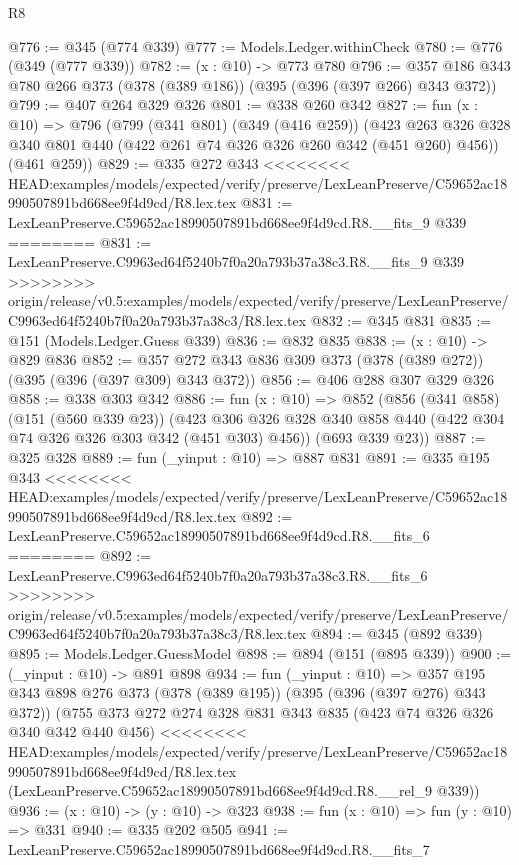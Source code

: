 \begin{lexlean}{R8}
\begin{coremodule}
{{{{{{{{{{{{{{{{{{{{{{{@776 := @345 (@774 @339)
@777 := Models.Ledger.withinCheck
@780 := @776 (@349 (@777 @339))
@782 := (x : @10) -> @773 @780
@796 := @357 @186 @343 @780 @266 @373 (@378 (@389 @186)) (@395 (@396 (@397 @266) @343 @372))
@799 := @407 @264 @329 @326
@801 := @338 @260 @342
@827 := fun (x : @10) =>
  @796
    (@799
      (@341 @801)
      (@349 (@416 @259))
      (@423 @263 @326 @328 @340 @801 @440 (@422 @261 @74 @326 @326 @260 @342 (@451 @260) @456))
      (@461 @259))
@829 := @335 @272 @343
<<<<<<<< HEAD:examples/models/expected/verify/preserve/LexLeanPreserve/C59652ac18990507891bd668ee9f4d9cd/R8.lex.tex
@831 := LexLeanPreserve.C59652ac18990507891bd668ee9f4d9cd.R8.__fits_9 @339
========
@831 := LexLeanPreserve.C9963ed64f5240b7f0a20a793b37a38c3.R8.__fits_9 @339
>>>>>>>> origin/release/v0.5:examples/models/expected/verify/preserve/LexLeanPreserve/C9963ed64f5240b7f0a20a793b37a38c3/R8.lex.tex
@832 := @345 @831
@835 := @151 (Models.Ledger.Guess @339)
@836 := @832 @835
@838 := (x : @10) -> @829 @836
@852 := @357 @272 @343 @836 @309 @373 (@378 (@389 @272)) (@395 (@396 (@397 @309) @343 @372))
@856 := @406 @288 @307 @329 @326
@858 := @338 @303 @342
@886 := fun (x : @10) =>
  @852
    (@856
      (@341 @858)
      (@151 (@560 @339 @23))
      (@423 @306 @326 @328 @340 @858 @440 (@422 @304 @74 @326 @326 @303 @342 (@451 @303) @456))
      (@693 @339 @23))
@887 := @325 @328
@889 := fun (_yinput : @10) => @887 @831
@891 := @335 @195 @343
<<<<<<<< HEAD:examples/models/expected/verify/preserve/LexLeanPreserve/C59652ac18990507891bd668ee9f4d9cd/R8.lex.tex
@892 := LexLeanPreserve.C59652ac18990507891bd668ee9f4d9cd.R8.__fits_6
========
@892 := LexLeanPreserve.C9963ed64f5240b7f0a20a793b37a38c3.R8.__fits_6
>>>>>>>> origin/release/v0.5:examples/models/expected/verify/preserve/LexLeanPreserve/C9963ed64f5240b7f0a20a793b37a38c3/R8.lex.tex
@894 := @345 (@892 @339)
@895 := Models.Ledger.GuessModel
@898 := @894 (@151 (@895 @339))
@900 := (_yinput : @10) -> @891 @898
@934 := fun (_yinput : @10) =>
  @357
    @195
    @343
    @898
    @276
    @373
    (@378 (@389 @195))
    (@395 (@396 (@397 @276) @343 @372))
    (@755
      @373
      @272
      @274
      @328
      @831
      @343
      @835
      (@423 @74 @326 @326 @340 @342 @440 @456)
<<<<<<<< HEAD:examples/models/expected/verify/preserve/LexLeanPreserve/C59652ac18990507891bd668ee9f4d9cd/R8.lex.tex
      (LexLeanPreserve.C59652ac18990507891bd668ee9f4d9cd.R8.__rel_9 @339))
@936 := (x : @10) -> (y : @10) -> @323
@938 := fun (x : @10) => fun (y : @10) => @331
@940 := @335 @202 @505
@941 := LexLeanPreserve.C59652ac18990507891bd668ee9f4d9cd.R8.__fits_7
}}}}}}}}}}}}}}}}}}}}}}}
\end{coremodule}
\end{lexlean}
